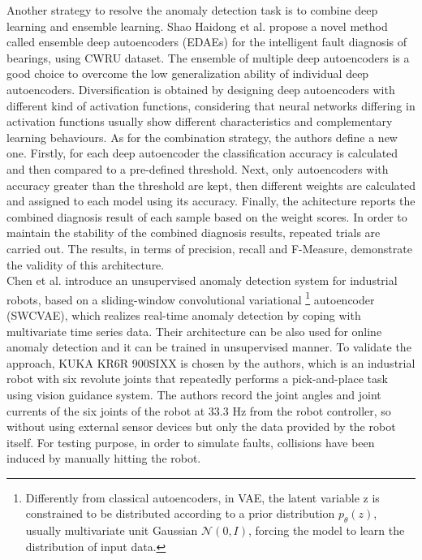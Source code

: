 Another strategy to resolve the anomaly detection task is to combine deep learning and ensemble learning. Shao Haidong et al. \cite{14NovelMethodEnsembleDeepAutoencoder} propose a novel method called ensemble deep autoencoders (EDAEs) for the intelligent fault diagnosis of bearings, using CWRU dataset. The ensemble of multiple deep autoencoders is a good choice to overcome the low generalization ability of individual deep autoencoders. Diversification is obtained by designing deep autoencoders with different kind of activation functions, considering that neural networks differing in activation functions usually show different characteristics and complementary learning behaviours. As for the combination strategy, the authors define a new one. Firstly, for each deep autoencoder the classification accuracy is calculated and then compared to a pre-defined threshold. Next, only autoencoders with accuracy greater than the threshold are kept, then different weights are calculated and assigned to each model using its accuracy. Finally, the achitecture reports the combined diagnosis result of each sample based on the weight scores. In order to maintain the stability of the combined diagnosis results, repeated trials are carried out. The results, in terms of precision, recall and F-Measure, demonstrate the validity of this architecture.\\
Chen et al. \cite{21RobotAnomalyDetection} introduce an unsupervised anomaly detection system for industrial robots, based on a sliding-window convolutional variational \footnote{Differently from classical autoencoders, in VAE, the latent variable z is constrained to be distributed according to a prior distribution $p_\theta (z)$, usually multivariate unit Gaussian $\mathcal{N}(0,I)$, forcing the model to learn the distribution of input data.}
autoencoder (SWCVAE), which realizes real-time anomaly detection by coping with multivariate time series data. Their architecture can be also used for online anomaly detection and it can be trained in unsupervised manner. To validate the approach, KUKA KR6R 900SIXX is chosen by the authors, which is an industrial robot with six revolute joints that repeatedly performs a pick-and-place task using vision guidance system. The authors record the joint angles and joint currents of the six joints of the robot at 33.3 Hz from the robot controller, so without using external sensor devices but only the data provided by the robot itself. For testing purpose, in order to simulate faults, collisions have been induced by manually hitting the robot.

